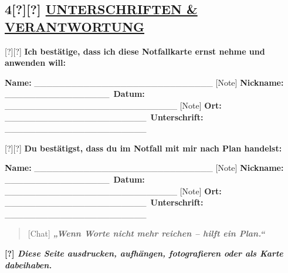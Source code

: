 \hypertarget{unterschriften-verantwortung}{%
\subsection{\texorpdfstring{\textbf{4[?][?] \ul{UNTERSCHRIFTEN \& VERANTWORTUNG}}}{4[?][?] UNTERSCHRIFTEN \& VERANTWORTUNG}}\label{unterschriften-verantwortung}}

[?][?] \textbf{Ich bestätige, dass ich diese Notfallkarte ernst nehme und anwenden will:}

\textbf{Name:} \_\_\_\_\_\_\_\_\_\_\_\_\_\_\_\_\_\_\_\_\_\_\_\_\_\_\_\_\_ [Note] \textbf{Nickname:} \_\_\_\_\_\_\_\_\_\_\_\_\_\_\_\_\_\
\textbf{Datum:} \_\_\_\_\_\_\_\_\_\_\_\_\_\_\_\_\_\_\_\_\_\_\_\_\_\_\_\_ [Note] \textbf{Ort:} \_\_\_\_\_\_\_\_\_\_\_\_\_\_\_\_\_\_\_\_\_\_\_\
\textbf{Unterschrift:} \_\_\_\_\_\_\_\_\_\_\_\_\_\_\_\_\_\_\_\_\_\_\_

[?][?] \textbf{Du bestätigst, dass du im Notfall mit mir nach Plan handelst:}

\textbf{Name:} \_\_\_\_\_\_\_\_\_\_\_\_\_\_\_\_\_\_\_\_\_\_\_\_\_\_\_\_\_ [Note] \textbf{Nickname:} \_\_\_\_\_\_\_\_\_\_\_\_\_\_\_\_\_\
\textbf{Datum:} \_\_\_\_\_\_\_\_\_\_\_\_\_\_\_\_\_\_\_\_\_\_\_\_\_\_\_\_ [Note] \textbf{Ort:} \_\_\_\_\_\_\_\_\_\_\_\_\_\_\_\_\_\_\_\_\_\_\_\
\textbf{Unterschrift:} \_\_\_\_\_\_\_\_\_\_\_\_\_\_\_\_\_\_\_\_\_\_\_

\begin{quote}
[Chat] \emph{\textbf{„Wenn Worte nicht mehr reichen -- hilft ein Plan.``}}
\end{quote}

\textbf{[?] \emph{Diese Seite ausdrucken, aufhängen, fotografieren oder als Karte dabeihaben.}}

